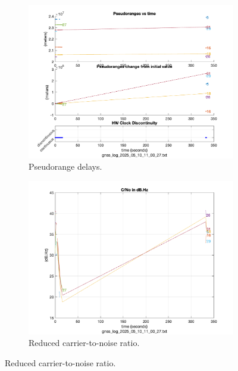         \begin{figure}[h!]
            \centering
            \begin{subfigure}{0.23\textwidth}
                \includegraphics[width=\textwidth]{images/tests/Monte_Cappuccini/Interferences/Samsung_A51_Monte_Cappuccini_interference_fig1.png}
                \caption{Pseudorange delays.}
                \label{fig:interference_pr}
            \end{subfigure}
            \hfill
            \begin{subfigure}{0.23\textwidth}
                \includegraphics[width=\textwidth]{images/tests/Monte_Cappuccini/Interferences/Samsung_A51_Monte_Cappuccini_interference_fig3.png}
                \caption{Reduced carrier-to-noise ratio.}

\end{subfigure}
\end{figure}
